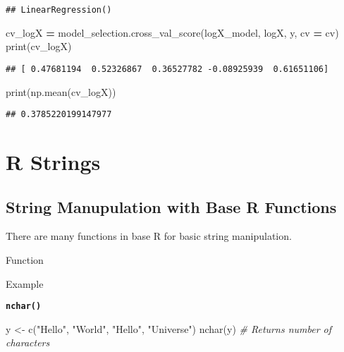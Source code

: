 \documentclass[
]{book}
\newenvironment{Shaded}{\begin{snugshade}}{\end{snugshade}}
\newcommand{\BuiltInTok}[1]{#1}
\newcommand{\CommentTok}[1]{\textcolor[rgb]{0.56,0.35,0.01}{\textit{#1}}}
\newcommand{\FunctionTok}[1]{\textcolor[rgb]{0.00,0.00,0.00}{#1}}
\newcommand{\NormalTok}[1]{#1}
\newcommand{\OperatorTok}[1]{\textcolor[rgb]{0.81,0.36,0.00}{\textbf{#1}}}
\newcommand{\OtherTok}[1]{\textcolor[rgb]{0.56,0.35,0.01}{#1}}
\newcommand{\StringTok}[1]{\textcolor[rgb]{0.31,0.60,0.02}{#1}}
\begin{document}
\begin{verbatim}
## LinearRegression()
\end{verbatim}

\begin{Shaded}
\begin{Highlighting}[]
\NormalTok{cv\_logX }\OperatorTok{=}\NormalTok{ model\_selection.cross\_val\_score(logX\_model, logX, y, cv }\OperatorTok{=}\NormalTok{ cv)}
\BuiltInTok{print}\NormalTok{(cv\_logX)}
\end{Highlighting}
\end{Shaded}

\begin{verbatim}
## [ 0.47681194  0.52326867  0.36527782 -0.08925939  0.61651106]
\end{verbatim}

\begin{Shaded}
\begin{Highlighting}[]
\BuiltInTok{print}\NormalTok{(np.mean(cv\_logX))}
\end{Highlighting}
\end{Shaded}

\begin{verbatim}
## 0.3785220199147977
\end{verbatim}

\hypertarget{r-strings}{%
\chapter{R Strings}\label{r-strings}}

\hypertarget{string-manupulation-with-base-r-functions}{%
\section{String Manupulation with Base R Functions}\label{string-manupulation-with-base-r-functions}}

There are many functions in base R for basic string manipulation.

Function

Example

{\textbf{\texttt{nchar()}
}}

\begin{Shaded}
\begin{Highlighting}[]
\NormalTok{y }\OtherTok{\textless{}{-}} \FunctionTok{c}\NormalTok{(}\StringTok{"Hello"}\NormalTok{, }\StringTok{"World"}\NormalTok{, }\StringTok{"Hello"}\NormalTok{, }\StringTok{"Universe"}\NormalTok{)}
\FunctionTok{nchar}\NormalTok{(y) }\CommentTok{\# Returns number of characters}
\end{Highlighting}
\end{Shaded}
\end{document}
